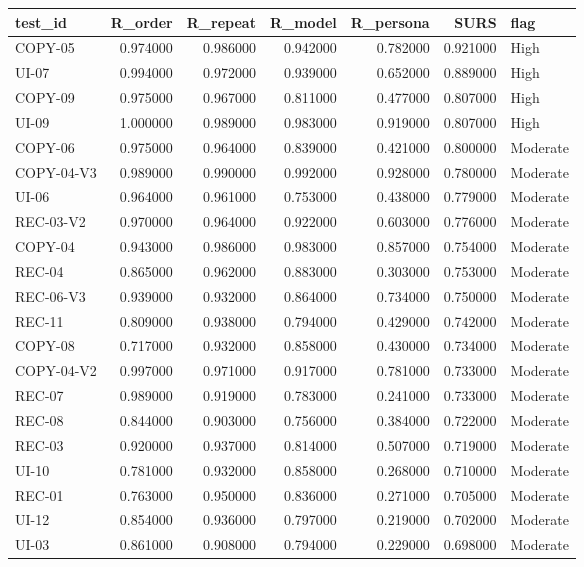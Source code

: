 \begin{tabular}{lrrrrrl}
\toprule
test_id & R_order & R_repeat & R_model & R_persona & SURS & flag \\
\midrule
COPY-05 & 0.974000 & 0.986000 & 0.942000 & 0.782000 & 0.921000 & High \\
UI-07 & 0.994000 & 0.972000 & 0.939000 & 0.652000 & 0.889000 & High \\
COPY-09 & 0.975000 & 0.967000 & 0.811000 & 0.477000 & 0.807000 & High \\
UI-09 & 1.000000 & 0.989000 & 0.983000 & 0.919000 & 0.807000 & High \\
COPY-06 & 0.975000 & 0.964000 & 0.839000 & 0.421000 & 0.800000 & Moderate \\
COPY-04-V3 & 0.989000 & 0.990000 & 0.992000 & 0.928000 & 0.780000 & Moderate \\
UI-06 & 0.964000 & 0.961000 & 0.753000 & 0.438000 & 0.779000 & Moderate \\
REC-03-V2 & 0.970000 & 0.964000 & 0.922000 & 0.603000 & 0.776000 & Moderate \\
COPY-04 & 0.943000 & 0.986000 & 0.983000 & 0.857000 & 0.754000 & Moderate \\
REC-04 & 0.865000 & 0.962000 & 0.883000 & 0.303000 & 0.753000 & Moderate \\
REC-06-V3 & 0.939000 & 0.932000 & 0.864000 & 0.734000 & 0.750000 & Moderate \\
REC-11 & 0.809000 & 0.938000 & 0.794000 & 0.429000 & 0.742000 & Moderate \\
COPY-08 & 0.717000 & 0.932000 & 0.858000 & 0.430000 & 0.734000 & Moderate \\
COPY-04-V2 & 0.997000 & 0.971000 & 0.917000 & 0.781000 & 0.733000 & Moderate \\
REC-07 & 0.989000 & 0.919000 & 0.783000 & 0.241000 & 0.733000 & Moderate \\
REC-08 & 0.844000 & 0.903000 & 0.756000 & 0.384000 & 0.722000 & Moderate \\
REC-03 & 0.920000 & 0.937000 & 0.814000 & 0.507000 & 0.719000 & Moderate \\
UI-10 & 0.781000 & 0.932000 & 0.858000 & 0.268000 & 0.710000 & Moderate \\
REC-01 & 0.763000 & 0.950000 & 0.836000 & 0.271000 & 0.705000 & Moderate \\
UI-12 & 0.854000 & 0.936000 & 0.797000 & 0.219000 & 0.702000 & Moderate \\
UI-03 & 0.861000 & 0.908000 & 0.794000 & 0.229000 & 0.698000 & Moderate \\

\end{tabular}
